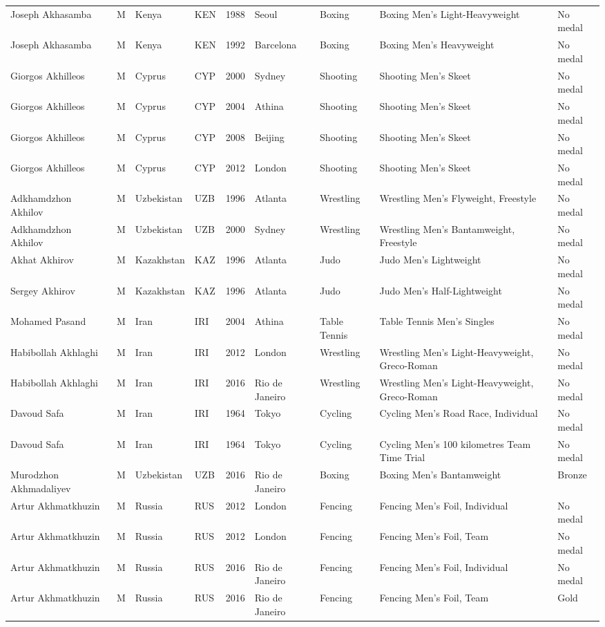 \documentclass{article}%
\begin{document}
\begin{longtable}{l l l l l l l l l}
Joseph Akhasamba&M&Kenya&KEN&1988&Seoul&Boxing&Boxing Men's Light{-}Heavyweight&No medal\\%
Joseph Akhasamba&M&Kenya&KEN&1992&Barcelona&Boxing&Boxing Men's Heavyweight&No medal\\%
Giorgos Akhilleos&M&Cyprus&CYP&2000&Sydney&Shooting&Shooting Men's Skeet&No medal\\%
Giorgos Akhilleos&M&Cyprus&CYP&2004&Athina&Shooting&Shooting Men's Skeet&No medal\\%
Giorgos Akhilleos&M&Cyprus&CYP&2008&Beijing&Shooting&Shooting Men's Skeet&No medal\\%
Giorgos Akhilleos&M&Cyprus&CYP&2012&London&Shooting&Shooting Men's Skeet&No medal\\%
Adkhamdzhon Akhilov&M&Uzbekistan&UZB&1996&Atlanta&Wrestling&Wrestling Men's Flyweight, Freestyle&No medal\\%
Adkhamdzhon Akhilov&M&Uzbekistan&UZB&2000&Sydney&Wrestling&Wrestling Men's Bantamweight, Freestyle&No medal\\%
Akhat Akhirov&M&Kazakhstan&KAZ&1996&Atlanta&Judo&Judo Men's Lightweight&No medal\\%
Sergey Akhirov&M&Kazakhstan&KAZ&1996&Atlanta&Judo&Judo Men's Half{-}Lightweight&No medal\\%
Mohamed Pasand&M&Iran&IRI&2004&Athina&Table Tennis&Table Tennis Men's Singles&No medal\\%
Habibollah Akhlaghi&M&Iran&IRI&2012&London&Wrestling&Wrestling Men's Light{-}Heavyweight, Greco{-}Roman&No medal\\%
Habibollah Akhlaghi&M&Iran&IRI&2016&Rio de Janeiro&Wrestling&Wrestling Men's Light{-}Heavyweight, Greco{-}Roman&No medal\\%
Davoud Safa&M&Iran&IRI&1964&Tokyo&Cycling&Cycling Men's Road Race, Individual&No medal\\%
Davoud Safa&M&Iran&IRI&1964&Tokyo&Cycling&Cycling Men's 100 kilometres Team Time Trial&No medal\\%
Murodzhon Akhmadaliyev&M&Uzbekistan&UZB&2016&Rio de Janeiro&Boxing&Boxing Men's Bantamweight&Bronze\\%
Artur Akhmatkhuzin&M&Russia&RUS&2012&London&Fencing&Fencing Men's Foil, Individual&No medal\\%
Artur Akhmatkhuzin&M&Russia&RUS&2012&London&Fencing&Fencing Men's Foil, Team&No medal\\%
Artur Akhmatkhuzin&M&Russia&RUS&2016&Rio de Janeiro&Fencing&Fencing Men's Foil, Individual&No medal\\%
Artur Akhmatkhuzin&M&Russia&RUS&2016&Rio de Janeiro&Fencing&Fencing Men's Foil, Team&Gold\\%

\end{longtable}
\end{document}
